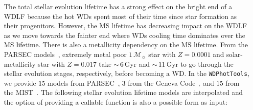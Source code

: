 \documentclass[fleqn,usenatbib]{rasti}
\newcommand{\msun}{\mathcal{M}_{\sun}}
\begin{document}
The total stellar evolution lifetime has a strong effect on the bright end of a
WDLF because the hot WDs spent most of their time since star formation as their
progenitors. However, the MS lifetime has decreasing impact on the WDLF as we
move towards the fainter end where WDs cooling time dominates over the MS
lifetime. There is also a metallicity dependency on the MS lifetime. From the
PARSEC models~\citep{2013EPJWC..4303001B}, extremely metal poor $1\,\msun$ star
with  $Z=0.0001$ and solar-metallicity star with $Z=0.017$ take $\sim$\,$6$\,Gyr
and $\sim$\,$11$\,Gyr to go through the stellar evolution stages, respectively,
before becoming a WD. In the \texttt{WDPhotTools}, we provide $15$ models from
PARSEC~\citep{2012MNRAS.427..127B, 2013EPJWC..4303001B, 2014MNRAS.444.2525C},
$3$ from the Geneva Code~\citep{2012A&A...537A.146E, 2012A&A...541A..41M,
2013A&A...553A..24G, 2013A&A...558A.103G}, and $15$ from the
MIST~\citep{2011ApJS..192....3P, 2013ApJS..208....4P, 2015ApJS..220...15P,
2016ApJS..222....8D, 2016ApJ...823..102C}. The following stellar evolution
lifetime models are interpolated and the option of providing a callable
function is also a possible form as input:
\end{document}
